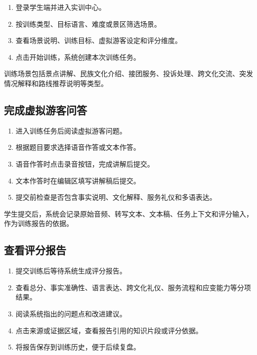 \begin{enumerate}[leftmargin=2em]
  \item 登录学生端并进入实训中心。
  \item 按训练类型、目标语言、难度或景区筛选场景。
  \item 查看场景说明、训练目标、虚拟游客设定和评分维度。
  \item 点击开始训练，系统创建本次训练任务。
\end{enumerate}

训练场景包括景点讲解、民族文化介绍、接团服务、投诉处理、跨文化交流、突发情况解释和路线推荐说明等类型。


\subsection{完成虚拟游客问答}

\begin{enumerate}[leftmargin=2em]
  \item 进入训练任务后阅读虚拟游客问题。
  \item 根据题目要求选择语音作答或文本作答。
  \item 语音作答时点击录音按钮，完成讲解后提交。
  \item 文本作答时在编辑区填写讲解稿后提交。
  \item 提交前检查是否包含事实说明、文化解释、服务礼仪和多语表达。
\end{enumerate}

学生提交后，系统会记录原始音频、转写文本、文本稿、任务上下文和评分输入，作为训练报告的依据。


\subsection{查看评分报告}

\begin{enumerate}[leftmargin=2em]
  \item 提交训练后等待系统生成评分报告。
  \item 查看总分、事实准确性、语言表达、跨文化礼仪、服务流程和应变能力等分项结果。
  \item 阅读系统指出的问题点和改进建议。
  \item 点击来源或证据区域，查看报告引用的知识片段或评分依据。
  \item 将报告保存到训练历史，便于后续复盘。
\end{enumerate}

